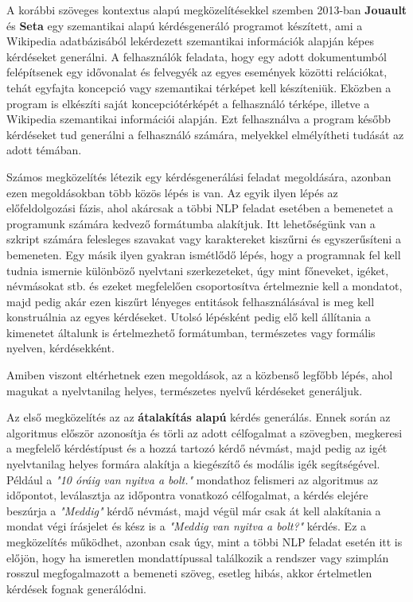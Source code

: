 A korábbi szöveges kontextus alapú megközelítésekkel szemben 2013-ban \textbf{Jouault} és \textbf{Seta} egy szemantikai alapú kérdésgeneráló programot készített, ami a Wikipedia adatbázisából lekérdezett szemantikai információk alapján képes kérdéseket generálni.\cite{wiki_qg} A felhasználók feladata, hogy egy adott dokumentumból felépítsenek egy idővonalat és felvegyék az egyes események közötti relációkat, tehát egyfajta koncepció vagy szemantikai térképet kell készíteniük. Eközben a program is elkészíti saját koncepciótérképét a felhasználó térképe, illetve a Wikipedia szemantikai információi alapján. Ezt felhasználva a program később kérdéseket tud generálni a felhasználó számára, melyekkel elmélyítheti tudását az adott témában.\cite{question_generation}


Számos megközelítés létezik egy kérdésgenerálási feladat megoldására, azonban ezen megoldásokban több közös lépés is van. Az egyik ilyen lépés az előfeldolgozási fázis, ahol akárcsak a többi NLP feladat esetében a bemenetet a programunk számára kedvező formátumba alakítjuk. Itt lehetőségünk van a szkript számára felesleges szavakat vagy karaktereket kiszűrni és egyszerűsíteni a bemeneten. Egy másik ilyen gyakran ismétlődő lépés, hogy a programnak fel kell tudnia ismernie különböző nyelvtani szerkezeteket, úgy mint főneveket, igéket, névmásokat stb. és ezeket megfelelően csoportosítva értelmeznie kell a mondatot, majd pedig akár ezen kiszűrt lényeges entitások felhasználásával is meg kell konstruálnia az egyes kérdéseket. Utolsó lépésként pedig elő kell állítania a kimenetet általunk is értelmezhető formátumban, természetes vagy formális nyelven, kérdésekként.

Amiben viszont eltérhetnek ezen megoldások, az a közbenső legfőbb lépés, ahol magukat a nyelvtanilag helyes, természetes nyelvű kérdéseket generáljuk.

Az első megközelítés az az \textbf{átalakítás alapú} kérdés generálás. Ennek során az algoritmus először azonosítja és törli az adott célfogalmat a szövegben, megkeresi a megfelelő kérdéstípust és a hozzá tartozó kérdő névmást, majd pedig az igét nyelvtanilag helyes formára alakítja a kiegészítő és modális igék segítségével. Például a \textit{"10 óráig van nyitva a bolt."} mondathoz felismeri az algoritmus az időpontot, leválasztja az időpontra vonatkozó célfogalmat, a kérdés elejére beszúrja a \textit{"Meddig"} kérdő névmást, majd végül már csak át kell alakítania a mondat végi írásjelet és kész is a \textit{"Meddig van nyitva a bolt?"} kérdés. Ez a megközelítés működhet, azonban csak úgy, mint a többi NLP feladat esetén itt is előjön, hogy ha ismeretlen mondattípussal találkozik a rendszer vagy szimplán rosszul megfogalmazott a bemeneti szöveg, esetleg hibás, akkor értelmetlen kérdések fognak generálódni.

